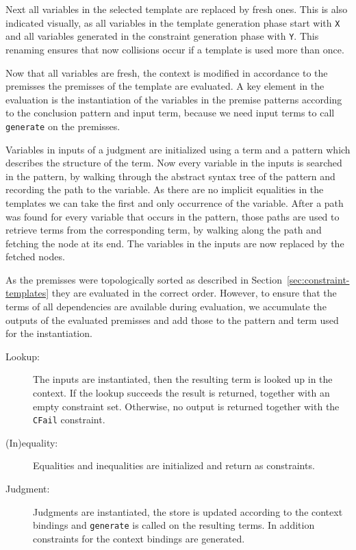 Next all variables in the selected template are replaced by fresh
ones. This is also indicated visually, as all variables in the
template generation phase start with \verb|X| and all variables
generated in the constraint generation phase with \verb|Y|. This
renaming ensures that now collisions occur if a template is used more
than once.

Now that all variables are fresh, the context is modified in
accordance to the premisses the premisses of the template are
evaluated. A key element in the evaluation is the instantiation of the
variables in the premise patterns according to the conclusion pattern
and input term, because we need input terms to call \verb|generate| on
the premisses.

Variables in inputs of a judgment are initialized using a term and a
pattern which describes the structure of the term. Now every variable
in the inputs is searched in the pattern, by walking through the
abstract syntax tree of the pattern and recording the path to the
variable. As there are no implicit equalities in the templates we can
take the first and only occurrence of the variable. After a path was
found for every variable that occurs in the pattern, those paths are
used to retrieve terms from the corresponding term, by walking along
the path and fetching the node at its end. The variables in the inputs
are now replaced by the fetched nodes.

As the premisses were topologically sorted as described in
Section~\ref{sec:constraint-templates} they are evaluated in the
correct order. However, to ensure that the terms of all dependencies
are available during evaluation, we accumulate the outputs of the
evaluated premisses and add those to the pattern and term used for the
instantiation.

\begin{description}
\item[Lookup:] The inputs are instantiated, then the resulting term is
  looked up in the context. If the lookup succeeds the result is
  returned, together with an empty constraint set. Otherwise, no
  output is returned together with the \verb|CFail| constraint.
\item[(In)equality:] Equalities and inequalities are initialized and
  return as constraints.
\item[Judgment:] Judgments are instantiated, the store is updated
  according to the context bindings and \verb|generate| is called on
  the resulting terms. In addition constraints for the context
  bindings are generated. 
\end{description}

